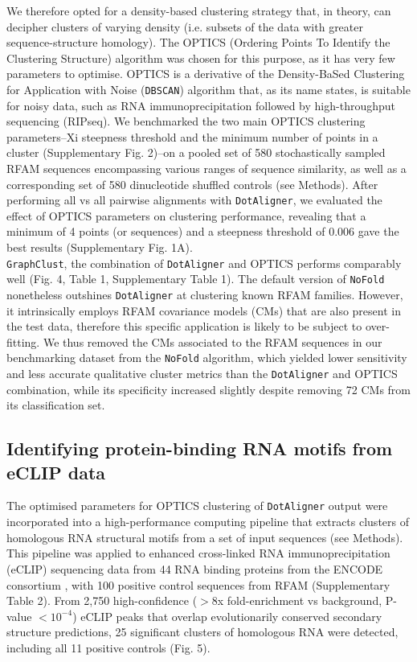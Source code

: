 \documentclass{bmcart}
\newcommand\dotaligner{\texttt{DotAligner}}
\begin{document}
We therefore opted for a density-based clustering strategy that, in theory, can decipher 
clusters of varying density (i.e. subsets of the data with greater sequence-structure homology). 
The OPTICS (Ordering Points To Identify the Clustering Structure) algorithm \cite{ankerst99ordering}
was chosen for this purpose, as it has very few parameters to optimise. 
OPTICS is a derivative of the Density-BaSed Clustering for Application with Noise
 (\texttt{DBSCAN}) \cite{ester1996density} algorithm that, as its name states, is suitable 
 for noisy data, such as RNA immunoprecipitation followed by high-throughput sequencing 
 (RIPseq). We  benchmarked the two main OPTICS clustering parameters--Xi steepness threshold 
and the minimum number of points in a cluster (Supplementary Fig. 2)--on 
a pooled set of 580 stochastically sampled RFAM sequences encompassing various ranges of sequence similarity, 
as well as a corresponding set of 580 dinucleotide shuffled controls (see Methods). 
After performing all vs all pairwise alignments with \dotaligner{}, 
we evaluated the effect of OPTICS parameters on clustering performance, 
revealing that a minimum of 4 points (or sequences) and a steepness threshold of 0.006 
gave the best results (Supplementary  Fig. 1A). \\

\texttt{GraphClust}, 
the combination of \dotaligner{} and OPTICS performs comparably well (Fig. 4, Table 1, Supplementary Table 1). 
The default version of \texttt{NoFold} nonetheless outshines \dotaligner{} at clustering known RFAM families. 
However, it intrinsically employs RFAM covariance models (CMs) that are also present in the test data, 
therefore this specific application is likely to be subject to over-fitting. 
We thus removed the CMs associated to the RFAM sequences in our benchmarking 
dataset from the \texttt{NoFold} algorithm, which yielded lower sensitivity and 
less accurate qualitative cluster metrics than the \dotaligner{} and OPTICS combination, while 
its specificity increased slightly despite removing 72 CMs from its classification set.


\subsection*{Identifying protein-binding RNA motifs from eCLIP data}
The optimised parameters for OPTICS clustering of \dotaligner{} output were incorporated into 
a high-performance computing pipeline that extracts clusters of homologous RNA structural
 motifs from a set of input sequences (see Methods).  This pipeline was applied to enhanced cross-linked 
RNA immunoprecipitation (eCLIP) sequencing data from 44 RNA binding proteins from the ENCODE consortium  \cite{van2016robust}, with 100 positive control sequences from RFAM (Supplementary Table 2).
From 2,750 high-confidence ($>$8x fold-enrichment vs background, P-value $<10^{-4}$) eCLIP peaks 
that overlap evolutionarily conserved secondary structure predictions, 
25 significant clusters of homologous RNA were detected, including all 11 positive controls (Fig. 5).\\
\end{document}
